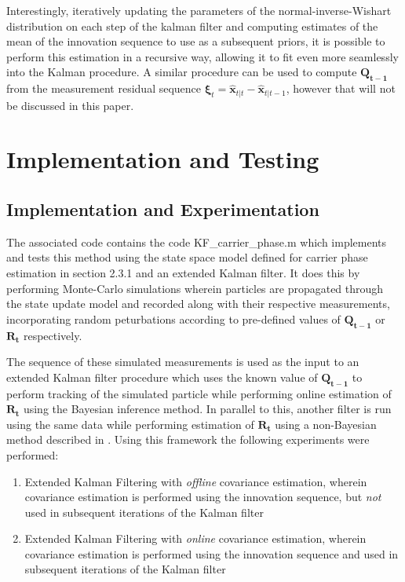 \documentclass[11pt]{article}
\begin{document}
\noindent Interestingly, iteratively updating the parameters of the normal-inverse-Wishart distribution on each step of the kalman filter and computing estimates of the mean of the innovation sequence to use as a subsequent priors, it is possible to perform this estimation in a recursive way, allowing it to fit even more seamlessly into the Kalman procedure. A similar procedure can be used to compute $\mathbf{Q_{t-1}}$ from the measurement residual sequence $\bm{\xi}_t = \hat{\mathbf{x}}_{t|t} - \hat{\mathbf{x}}_{t|t-1}$, however that will not be discussed in this paper.

\section{Implementation and Testing}

\subsection{Implementation and Experimentation}

The associated code contains the code KF\_carrier\_phase.m which implements and tests this method using the state space model defined for carrier phase estimation in section 2.3.1 and an extended Kalman filter. It does this by performing Monte-Carlo simulations wherein particles are propagated through the state update model and recorded along with their respective measurements, incorporating random peturbations according to pre-defined values of $\mathbf{Q_{t-1}}$ or $\mathbf{R_{t}}$ respectively.

The sequence of these simulated measurements is used as the input to an extended Kalman filter procedure which uses the known value of $\mathbf{Q_{t-1}}$ to perform tracking of the simulated particle while performing online estimation of $\mathbf{R_{t}}$ using the Bayesian inference method. In parallel to this, another filter is run using the same data while performing estimation of $\mathbf{R_{t}}$ using a non-Bayesian method described in \cite{Myer-76}. Using this framework the following experiments were performed:

\begin{enumerate}
    \item Extended Kalman Filtering with \textit{offline} covariance estimation, wherein covariance estimation is performed using the innovation sequence, but \textit{not} used in subsequent iterations of the Kalman filter
    \item Extended Kalman Filtering with \textit{online} covariance estimation, wherein covariance estimation is performed using the innovation sequence and used in subsequent iterations of the Kalman filter
\end{enumerate}
\end{document}
